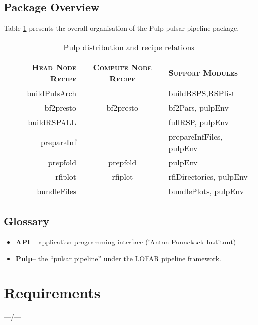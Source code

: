 \documentclass[a4paper,10pt,bibtotoc]{scrartcl}
\begin{document}
\subsection{Package Overview}
\label{sec:package}
Table \ref{tab:recipeTable} presents the overall organisation of the Pulp
pulsar pipeline package.

\begin{table}[ht]
\centering
\begin{tabular}{rcl|}
\hline
\textsc{Head Node Recipe} &\textsc{Compute Node Recipe}&\textsc{Support Modules}\\
\hline \hline
buildPulsArch & --- & buildRSPS,RSPlist\\
    bf2presto & bf2presto & bf2Pars, pulpEnv\\
  buildRSPALL &    ---    & fullRSP, pulpEnv\\
   prepareInf &    ---    & prepareInfFiles, pulpEnv\\
     prepfold & prepfold  & pulpEnv\\
      rfiplot & rfiplot   & rfiDirectories, pulpEnv\\
  bundleFiles &    ---    & bundlePlots, pulpEnv\\
    \hline
  \end{tabular}
  \caption{Pulp distribution and recipe relations}
  \label{tab:recipeTable}
\end{table}



\subsection{Glossary}
\begin{itemize}
\item \textbf{API} -- application programming interface (!Anton Pannekoek Instituut).
\item \textbf{Pulp}-- the ``pulsar pipeline'' under the LOFAR pipeline framework.
\end{itemize}




\section{Requirements}
\label{sec:requirements}

---/---
\end{document}
